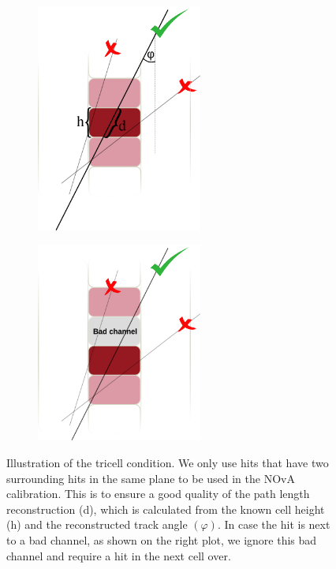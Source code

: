 \begin{figure}[hbtp]
\centering
\begin{subfigure}[b]{0.49\textwidth}
\centering
\includegraphics[width=0.6\textwidth]{Plots/NOvAExperiment/TricellConditionWithDescription.png}
\caption{}
\end{subfigure}
\begin{subfigure}[b]{0.49\textwidth}
\centering
\includegraphics[width=0.6\textwidth]{Plots/NOvAExperiment/TricellConditionWithBadChannel.png}
\caption{}
\end{subfigure}
\caption[Tricell condition for calibration hits in NOvA]{Illustration of the tricell condition. We only use hits that have two surrounding hits in the same plane to be used in the NOvA calibration. This is to ensure a good quality of the path length reconstruction (d), which is calculated from the known cell height (h) and the reconstructed track angle $\left(\varphi\right)$. In case the hit is next to a bad channel, as shown on the right plot, we ignore this bad channel and require a hit in the next cell over.}
\label{figTricellCondition}
\end{figure}

